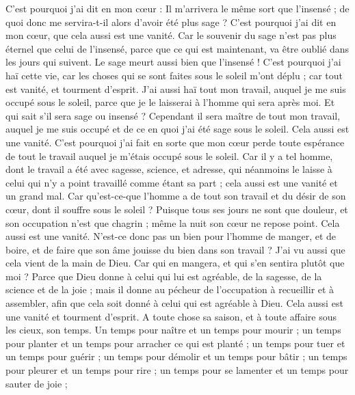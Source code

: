 \begin{multicols}{2}
C'est pourquoi j'ai dit en mon cœur : Il m'arrivera le même sort que l'insensé ; de quoi donc me servira-t-il alors d'avoir été plus sage ? C'est pourquoi j'ai dit en mon cœur, que cela aussi est une vanité. 
Car le souvenir du sage n'est pas plus éternel que celui de l'insensé, parce que ce qui est maintenant, va être oublié dans les jours qui suivent. Le sage meurt aussi bien que l'insensé !
C'est pourquoi j'ai haï cette vie, car les choses qui se sont faites sous le soleil m'ont déplu ; car tout est vanité, et tourment d'esprit.
J'ai aussi haï tout mon travail, auquel je me suis occupé sous le soleil, parce que je le laisserai à l'homme qui sera après moi.
Et qui sait s'il sera sage ou insensé ? Cependant il sera maître de tout mon travail, auquel je me suis occupé et de ce en quoi j'ai été sage sous le soleil. Cela aussi est une vanité.
C'est pourquoi j'ai fait en sorte que mon cœur perde toute espérance de tout le travail auquel je m'étais occupé sous le soleil.
Car il y a tel homme, dont le travail a été avec sagesse, science, et adresse, qui néanmoins le laisse à celui qui n'y a point travaillé comme étant sa part ; cela aussi est une vanité et un grand mal. 
Car qu'est-ce-que l'homme a de tout son travail et du désir de son cœur, dont il souffre sous le soleil ?
Puisque tous ses jours ne sont que douleur, et son occupation n'est que chagrin ; même la nuit son cœur ne repose point. Cela aussi est une vanité.
N'est-ce donc pas un bien pour l'homme de manger, et de boire, et de faire que son âme jouisse du bien dans son travail ? J'ai vu aussi que cela vient de la main de Dieu.
Car qui en mangera, et qui s'en sentira plutôt que moi ?
Parce que Dieu donne à celui qui lui est agréable, de la sagesse, de la science et de la joie ; mais il donne au pécheur de l'occupation à recueillir et à assembler, afin que cela soit donné à celui qui est agréable à Dieu. Cela aussi est une vanité et tourment d'esprit.
\VerseOne{}A toute chose sa saison, et à toute affaire sous les cieux, son temps.
Un temps pour naître et un temps pour mourir ; un temps pour planter et un temps pour arracher ce qui est planté ;
un temps pour tuer et un temps pour guérir ; un temps pour démolir et un temps pour bâtir ;
un temps pour pleurer et un temps pour rire ; un temps pour se lamenter et un temps pour sauter de joie ;

\end{multicols}
